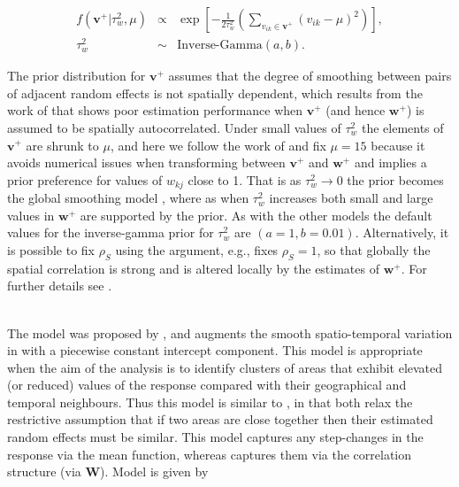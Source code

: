 \documentclass[article, nojss]{jss}
\begin{document}
\begin{eqnarray}
f(\mathbf{v}^{+}|\tau^2_w, \mu) & \propto & \exp\left[-\frac{1}{2\tau^2_w}\left(\sum_{v_{ik}\in\mathbf{v}^{+}}(v_{ik} - \mu)^2\right)\right], \label{caradaptive2}\\
\tau^{2}_w&\sim&\mbox{Inverse-Gamma}(a, b).\nonumber
\end{eqnarray}

The prior distribution for $\mathbf{v}^+$ assumes that the degree of smoothing between pairs of adjacent random effects is not spatially dependent, which results from the  work of \cite{rushworth2016} that shows poor estimation performance when $\mathbf{v}^+$ (and hence $\mathbf{w}^+$) is assumed to be spatially autocorrelated. Under small values of $\tau_w^2$ the elements of  $\mathbf{v}^+$ are shrunk to $\mu$, and here we follow the work of \cite{rushworth2016} and fix $\mu=15$ because it avoids numerical issues when transforming between $\mathbf{v}^+$ and $\mathbf{w}^+$ and implies a prior preference for values of $w_{kj}$ close to 1.  That is as $\tau^2_w \rightarrow 0$ the prior becomes the global smoothing model , where as when $\tau^{2}_{w}$ increases both small and large values in $\mathbf{w}^{+}$ are supported by the prior. As with the other models the default values for the inverse-gamma prior for $\tau_w^2$ are $(a=1, b=0.01)$. Alternatively, it is possible to fix $\rho_S$ using the  argument, e.g.,  fixes $\rho_S=1$, so that globally the spatial correlation is strong and is altered locally by the estimates of $\mathbf{w}^+$. For further details see \cite{rushworth2016}.\vspace{1cm}


\\
The model was proposed by \cite{lee2016}, and augments the smooth spatio-temporal variation in  with a piecewise constant intercept component.  This model is appropriate when the aim of the analysis is to identify clusters of areas that exhibit elevated (or reduced) values of the response compared with their geographical and temporal neighbours. Thus this model is similar to  , in that both relax the restrictive assumption that if two areas are close together then their estimated random effects must be similar. This model captures any step-changes in the response via the mean function, whereas  captures them via the correlation structure (via $\mathbf{W}$). Model  is given by
\end{document}
